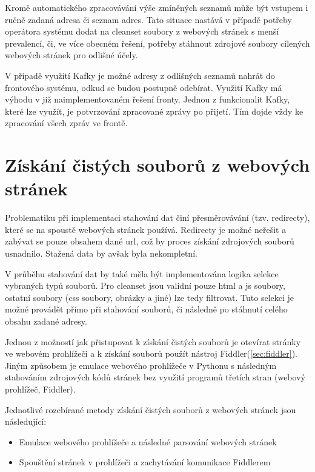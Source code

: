 \documentclass[thesis=M,czech,hidelinks]{FITthesis}[2013/05/06]
\begin{document}
Kromě automatického zpracovávání výše zmíněných seznamů může být vstupem i ručně zadaná adresa či seznam adres. Tato situace nastává v případě potřeby operátora systému dodat na cleanset soubory z webových stránek s menší prevalencí, či, ve více obecném řešení, potřeby stáhnout zdrojové soubory cílených webových stránek pro odlišné účely.

V případě využití Kafky je možné adresy z odlišných seznamů nahrát do frontového systému, odkud se budou postupně odebírat. Využití Kafky má výhodu v již naimplementovaném řešení fronty. Jednou z funkcionalit Kafky, které lze využít, je potvrzování zpracované zprávy po přijetí. Tím dojde vždy ke zpracování všech zpráv ve frontě. 





\section{Získání čistých souborů z webových stránek}
Problematiku při implementaci stahování dat činí přesměrovávání (tzv. redirecty), které se na spoustě webových stránek používá. Redirecty je možné neřešit a zabývat se pouze obsahem dané url, což by proces získání zdrojových souborů usnadnilo. Stažená data by avšak byla nekompletní.

V průběhu stahování dat by také měla být implementována logika selekce vybraných typů souborů. Pro cleanset jsou validní pouze html a js soubory, ostatní soubory (css soubory, obrázky a jiné) lze tedy filtrovat. Tuto selekci je možné provádět přímo při stahování souborů, či následně po stáhnutí celého obsahu zadané adresy.

Jednou z možností jak přistupovat k získání čistých souborů je otevírat stránky ve webovém prohlížeči a k získání souborů použít nástroj Fiddler(\ref{sec:fiddler}). Jiným způsobem je emulace webového prohlížeče v Pythonu s následným stahováním zdrojových kódů stránek bez využití programů třetích stran (webový prohlížeč, Fiddler).

Jednotlivé rozebírané metody získání čistých souborů z webových stránek jsou následující:
\begin{itemize}
	\item Emulace webového prohlížeče a následné parsování webových stránek 
	\item Spouštění stránek v prohlížeči a zachytávání komunikace Fiddlerem
\end{itemize}
\end{document}

